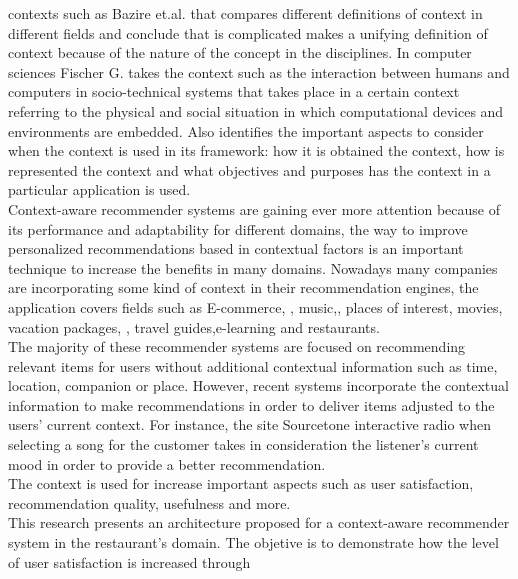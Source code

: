 contexts such as Bazire et.al.\cite{bazire2005understanding} that compares 
different definitions of context in different fields and conclude that is
complicated makes a unifying definition of context because of the
nature of the concept in the disciplines. In computer sciences Fischer
G.\cite{fischer2012context} takes the context such as the interaction
between humans and computers in socio-technical systems that takes
place in a certain context referring to the physical and social
situation in which computational devices and environments are
embedded. Also identifies the important aspects to consider when the
context is used in its framework: how it is obtained the context, how
is represented the context and what objectives and purposes has the
context in a particular application is used. \\
Context-aware recommender systems are gaining ever more attention
because of its performance and adaptability for different domains, the
way to improve personalized recommendations based in contextual
factors is an important technique to increase the benefits in many
domains. Nowadays many companies are incorporating some kind of
context in their recommendation engines, the application covers fields
such as E-commerce\cite{schafer1999recommender}, \cite{bulander2005enabling},
music\cite{ricci2012context},\cite{baltrunas2011incarmusic}, 
places of interest\cite{baltrunas2012context},
movies\cite{eyjolfsdottir2010moviegen}, vacation packages\cite{liu2011personalized},
\cite{liu2014cocktail}, travel guides\cite{savage2012m},e-learning\cite{ortigosa2010entornos} and restaurants\cite{chu2013chinese}.\\  
The majority of these recommender systems are focused on 
recommending relevant items for users without
additional contextual information such as time, location,
companion or place. However, recent systems incorporate the contextual
information to make recommendations in order to deliver items adjusted
to the users' current context. For instance, the site Sourcetone
interactive radio \cite{huq2010automated} when selecting a song for
the customer takes in consideration the listener's current mood in
order to provide a better recommendation. \\ The context is used for
increase important aspects such as user satisfaction, recommendation
quality, usefulness and more.\\
This research presents an architecture proposed for a context-aware
recommender system in the restaurant's domain. The objetive is to
demonstrate how the level of user satisfaction is increased through

